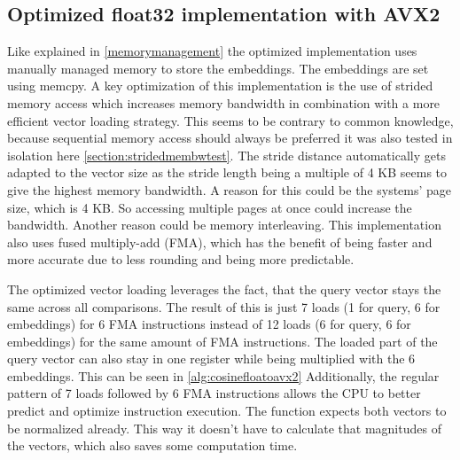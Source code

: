 \subsection{Optimized float32 implementation with AVX2}
\label{floatoavx2}
Like explained in \autoref{memorymanagement} the optimized implementation uses manually managed memory to store the embeddings. The embeddings are set using memcpy.
A key optimization of this implementation is the use of strided memory access which increases memory bandwidth in combination with a more efficient vector loading strategy. This seems to be contrary to common knowledge, because sequential memory access should always be preferred it was also tested in isolation here \autoref{section:stridedmembwtest}.
The stride distance automatically gets adapted to the vector size as the stride length being a multiple of 4 KB seems to give the highest memory bandwidth. A reason for this could be the systems' page size, which is 4 KB. So accessing multiple pages at once could increase the bandwidth. Another reason could be memory interleaving.
This implementation also uses fused multiply-add (FMA), which has the benefit of being faster and more accurate due to less rounding and being more predictable.~\cite{fma}

The optimized vector loading leverages the fact, that the query vector stays the same across all comparisons. The result of this is just 7 loads (1 for query, 6 for embeddings) for 6 FMA instructions instead of 12 loads (6 for query, 6 for embeddings) for the same amount of FMA instructions. The loaded part of the query vector can also stay in one register while being multiplied with the 6 embeddings. This can be seen in \autoref{alg:cosinefloatoavx2}
Additionally, the regular pattern of 7 loads followed by 6 FMA instructions allows the CPU to better predict and optimize instruction execution.
The function expects both vectors to be normalized already. This way it doesn't have to calculate that magnitudes of the vectors, which also saves some computation time.


